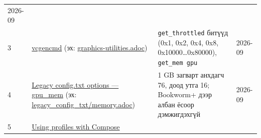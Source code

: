 \begin{longtable}[]{@{}llll@{}}
\begin{minipage}[t]{0.22\columnwidth}
2026-09\strut
\end{minipage}\tabularnewline
\begin{minipage}[t]{0.22\columnwidth}\raggedright
3\strut
\end{minipage} & \begin{minipage}[t]{0.22\columnwidth}\raggedright
\href{https://www.raspberrypi.com/documentation/computers/os.html\#vcgencmd}{vcgencmd} (эх: \href{https://github.com/raspberrypi/documentation/blob/master/documentation/asciidoc/computers/os/graphics-utilities.adoc}{graphics-utilities.\allowbreak{}adoc})\strut
\end{minipage} & \begin{minipage}[t]{0.22\columnwidth}\raggedright
\texttt{get\_throttled} битүүд (0x1, 0x2, 0x4, 0x8, 0x10000\ldots0x80000), \texttt{get\_mem\ gpu}\strut
\end{minipage} & \begin{minipage}[t]{0.22\columnwidth}\raggedright
2026-09\strut
\end{minipage}\tabularnewline
\begin{minipage}[t]{0.22\columnwidth}\raggedright
4\strut
\end{minipage} & \begin{minipage}[t]{0.22\columnwidth}\raggedright
\href{https://www.raspberrypi.com/documentation/computers/legacy_config_txt.html}{Legacy config.\allowbreak{}txt options --- gpu\_\allowbreak{}mem} (эх: \href{https://github.com/raspberrypi/documentation/blob/master/documentation/asciidoc/computers/legacy_config_txt/memory.adoc}{legacy\_\allowbreak{}config\_\allowbreak{}txt/\allowbreak{}memory.\allowbreak{}adoc})\strut
\end{minipage} & \begin{minipage}[t]{0.22\columnwidth}\raggedright
1 GB загварт анхдагч 76, доод утга 16; Bookworm+ дээр албан ёсоор дэмжигдэхгүй\strut
\end{minipage} & \begin{minipage}[t]{0.22\columnwidth}\raggedright
2026-09\strut
\end{minipage}\tabularnewline
\begin{minipage}[t]{0.22\columnwidth}\raggedright
5\strut
\end{minipage} & \begin{minipage}[t]{0.22\columnwidth}\raggedright
\href{https://docs.docker.com/compose/how-tos/profiles/}{Using profiles with Compose}\strut
\end{minipage} & \begin{minipage}[t]{0.22\columnwidth}\raggedright

\end{minipage}
\end{longtable}

